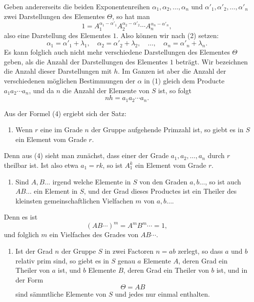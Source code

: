 \documentclass[11pt]{article}
\begin{document}
Geben andererseits die beiden Exponentenreihen $\alpha_1,\alpha_2,\ldots,\alpha_n$ und $\alpha'_1,\alpha'_2,\ldots,\alpha'_n$ zwei Darstellungen des Elementes $\Theta$, so hat man
\begin{equation}
1=A_1^{\alpha_1-\alpha'_1}A_2^{\alpha_2-\alpha'_2}\cdots A_n^{\alpha_n-\alpha'_n},
\tag{3}
\end{equation}
also eine Darstellung des Elementes $1$. Also können wir nach (2) setzen:
\[
\alpha_1=\alpha'_1+\lambda_1,
\quad \alpha_2=\alpha'_2+\lambda_2,
\quad \ldots,
\quad \alpha_n=\alpha'_n+\lambda_n.
\]
Es kann folglich auch nicht mehr verschiedene Darstellungen des Elementes $\Theta$ geben, als die Anzahl der Darstellungen des Elementes $1$ beträgt. Wir bezeichnen die Anzahl dieser Darstellungen mit $h$. Im Ganzen ist aber die Anzahl der verschiedenen möglichen Bestimmungen der $\alpha$ in (1) gleich dem Producte $a_1a_2\cdots a_n$, und da $n$ die Anzahl der Elemente von $S$ ist, so folgt
\begin{equation}
nh=a_1a_2\cdots a_n.
\tag{4}
\end{equation}

Aus der Formel (4) ergiebt sich der Satz:

\begin{enumerate}[resume,label=\arabic*.]
\item Wenn $r$ eine im Grade $n$ der Gruppe aufgehende Primzahl ist, so giebt es in $S$ ein Element vom Grade $r$.
\end{enumerate}

Denn aus (4) sieht man zunächst, dass einer der Grade $a_1,a_2,\ldots,a_n$ durch $r$ theilbar ist. Ist also etwa $a_1=rk$, so ist $A_1^k$ ein Element vom Grade $r$.

\begin{enumerate}[resume,label=\arabic*.]
\item Sind $A,B\ldots$ irgend welche Elemente in $S$ von den Graden $a,b\ldots$, so ist auch $AB\ldots$ ein Element in $S$, und der Grad dieses Productes ist ein Theiler des kleinsten gemeinschaftlichen Vielfachen $m$ von $a,b\ldots$.
\end{enumerate}

Denn es ist
\[
(AB\cdots)^m=A^mB^m\cdots=1,
\]
und folglich $m$ ein Vielfaches des Grades von $AB\cdots$.

\begin{enumerate}[resume,label=\arabic*.]
\item Ist der Grad $n$ der Gruppe $S$ in zwei Factoren $n=ab$ zerlegt, so dass $a$ und $b$ relativ prim sind, so giebt es in $S$ genau $a$ Elemente $A$, deren Grad ein Theiler von $a$ ist, und $b$ Elemente $B$, deren Grad ein Theiler von $b$ ist, und in der Form
\begin{equation}
\Theta=AB
\tag{5}
\end{equation}
sind sämmtliche Elemente von $S$ und jedes nur einmal enthalten.
\end{enumerate}
\end{document}
